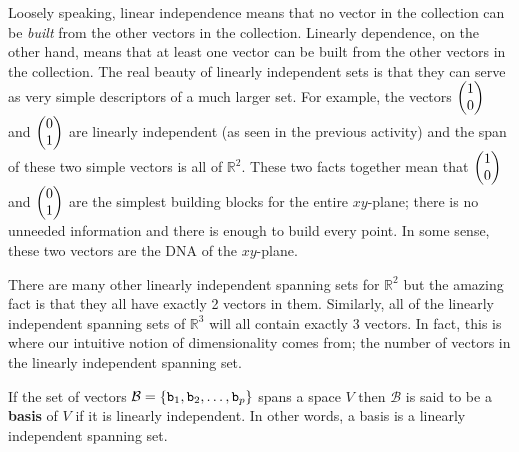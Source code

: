 Loosely speaking, linear independence means that no vector in the collection can be {\it
built} from the other vectors in the collection.   Linearly dependence, on the other hand,
means that at least one vector can be built from the other vectors in the collection.  The
real beauty of linearly independent sets is that they can serve as very simple descriptors
of a much larger set.  For example, the vectors $\begin{pmatrix} 1\\0\end{pmatrix}$ and $\begin{pmatrix} 0\\1\end{pmatrix}$ are
linearly independent (as seen in the previous activity) and the span of these two simple
vectors is all of $\mathbb{R}^2$.  These two facts together mean that $\begin{pmatrix}1\\0\end{pmatrix}$ and
$\begin{pmatrix}0\\1\end{pmatrix}$ are the simplest building blocks for the entire $xy$-plane; there is no
unneeded information and there is enough to build every point.  In some sense, these two
vectors are the DNA of the $xy$-plane.

There are many other
linearly independent spanning sets for $\mathbb{R}^2$ but the amazing fact is that they
all have exactly 2 vectors in them.  Similarly, all of the linearly independent spanning
sets of $\mathbb{R}^3$ will all contain exactly 3 vectors.  In fact, this is where our
intuitive notion of dimensionality comes from; the number of vectors in the linearly
independent spanning set.

\begin{definition}
    If the set of vectors $\mathcal{B} = \{\texttt{b}_1, \texttt{b}_2, \dots, \texttt{b}_p \}$ spans a space
    $V$ then $\mathcal{B}$ is said to be a {\bf basis} of $V$ if it is linearly
    independent.  In other words, a basis is a linearly independent spanning set.
\end{definition}


